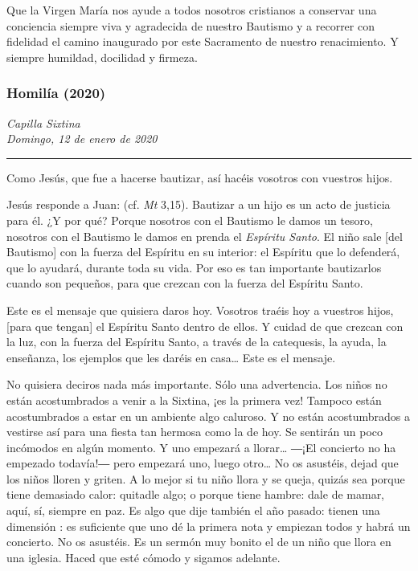{Que la Virgen María nos ayude a todos nosotros cristianos a conservar una conciencia siempre viva y agradecida de nuestro Bautismo y a recorrer con fidelidad el camino inaugurado por este Sacramento de nuestro renacimiento. Y siempre humildad, docilidad y firmeza.

\subsubsection{Homilía (2020)} \emph{Capilla Sixtina\\ Domingo, 12 de enero de 2020}

\begin{center}\rule{0.5\linewidth}{\linethickness}\end{center}



Como Jesús, que fue a hacerse bautizar, así hacéis vosotros con vuestros hijos.

Jesús responde a Juan:  (cf. \emph{Mt} 3,15). Bautizar a un hijo es un acto de justicia para él. ¿Y por qué? Porque nosotros con el Bautismo le damos un tesoro, nosotros con el Bautismo le damos en prenda el \emph{Espíritu Santo}. El niño sale {[}del Bautismo{]} con la fuerza del Espíritu en su interior: el Espíritu que lo defenderá, que lo ayudará, durante toda su vida. Por eso es tan importante bautizarlos cuando son pequeños, para que crezcan con la fuerza del Espíritu Santo.

Este es el mensaje que quisiera daros hoy. Vosotros traéis hoy a vuestros hijos, {[}para que tengan{]} el Espíritu Santo dentro de ellos. Y cuidad de que crezcan con la luz, con la fuerza del Espíritu Santo, a través de la catequesis, la ayuda, la enseñanza, los ejemplos que les daréis en casa\ldots{} Este es el mensaje.

No quisiera deciros nada más importante. Sólo una advertencia. Los niños no están acostumbrados a venir a la Sixtina, ¡es la primera vez! Tampoco están acostumbrados a estar en un ambiente algo caluroso. Y no están acostumbrados a vestirse así para una fiesta tan hermosa como la de hoy. Se sentirán un poco incómodos en algún momento. Y uno empezará a llorar\ldots{} ―¡El concierto no ha empezado todavía!― pero empezará uno, luego otro\ldots{} No os asustéis, dejad que los niños lloren y griten. A lo mejor si tu niño llora y se queja, quizás sea porque tiene demasiado calor: quitadle algo; o porque tiene hambre: dale de mamar, aquí, sí, siempre en paz. Es algo que dije también el año pasado: tienen una dimensión : es suficiente que uno dé la primera nota y empiezan todos y habrá un concierto. No os asustéis. Es un sermón muy bonito el de un niño que llora en una iglesia. Haced que esté cómodo y sigamos adelante.

}
